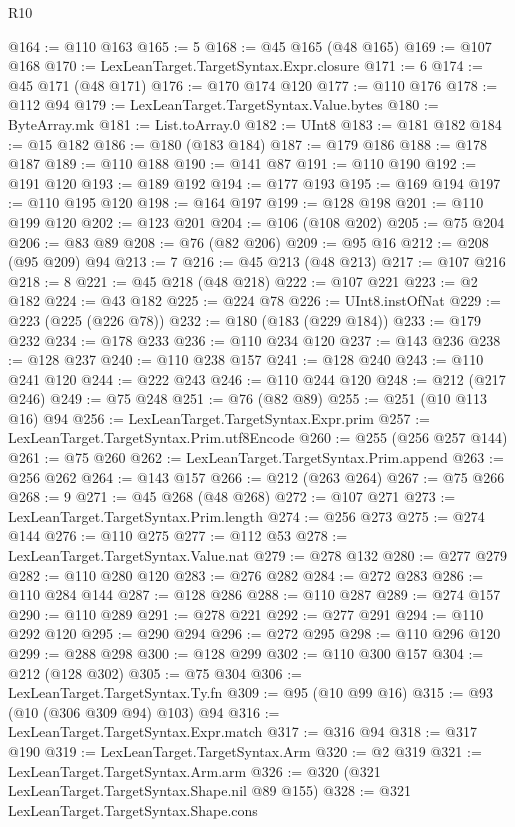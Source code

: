 \begin{lexlean}{R10}
\begin{coremodule}
@164 := @110 @163
@165 := 5
@168 := @45 @165 (@48 @165)
@169 := @107 @168
@170 := LexLeanTarget.TargetSyntax.Expr.closure
@171 := 6
@174 := @45 @171 (@48 @171)
@176 := @170 @174 @120
@177 := @110 @176
@178 := @112 @94
@179 := LexLeanTarget.TargetSyntax.Value.bytes
@180 := ByteArray.mk
@181 := List.toArray.{0}
@182 := UInt8
@183 := @181 @182
@184 := @15 @182
@186 := @180 (@183 @184)
@187 := @179 @186
@188 := @178 @187
@189 := @110 @188
@190 := @141 @87
@191 := @110 @190
@192 := @191 @120
@193 := @189 @192
@194 := @177 @193
@195 := @169 @194
@197 := @110 @195 @120
@198 := @164 @197
@199 := @128 @198
@201 := @110 @199 @120
@202 := @123 @201
@204 := @106 (@108 @202)
@205 := @75 @204
@206 := @83 @89
@208 := @76 (@82 @206)
@209 := @95 @16
@212 := @208 (@95 @209) @94
@213 := 7
@216 := @45 @213 (@48 @213)
@217 := @107 @216
@218 := 8
@221 := @45 @218 (@48 @218)
@222 := @107 @221
@223 := @2 @182
@224 := @43 @182
@225 := @224 @78
@226 := UInt8.instOfNat
@229 := @223 (@225 (@226 @78))
@232 := @180 (@183 (@229 @184))
@233 := @179 @232
@234 := @178 @233
@236 := @110 @234 @120
@237 := @143 @236
@238 := @128 @237
@240 := @110 @238 @157
@241 := @128 @240
@243 := @110 @241 @120
@244 := @222 @243
@246 := @110 @244 @120
@248 := @212 (@217 @246)
@249 := @75 @248
@251 := @76 (@82 @89)
@255 := @251 (@10 @113 @16) @94
@256 := LexLeanTarget.TargetSyntax.Expr.prim
@257 := LexLeanTarget.TargetSyntax.Prim.utf8Encode
@260 := @255 (@256 @257 @144)
@261 := @75 @260
@262 := LexLeanTarget.TargetSyntax.Prim.append
@263 := @256 @262
@264 := @143 @157
@266 := @212 (@263 @264)
@267 := @75 @266
@268 := 9
@271 := @45 @268 (@48 @268)
@272 := @107 @271
@273 := LexLeanTarget.TargetSyntax.Prim.length
@274 := @256 @273
@275 := @274 @144
@276 := @110 @275
@277 := @112 @53
@278 := LexLeanTarget.TargetSyntax.Value.nat
@279 := @278 @132
@280 := @277 @279
@282 := @110 @280 @120
@283 := @276 @282
@284 := @272 @283
@286 := @110 @284 @144
@287 := @128 @286
@288 := @110 @287
@289 := @274 @157
@290 := @110 @289
@291 := @278 @221
@292 := @277 @291
@294 := @110 @292 @120
@295 := @290 @294
@296 := @272 @295
@298 := @110 @296 @120
@299 := @288 @298
@300 := @128 @299
@302 := @110 @300 @157
@304 := @212 (@128 @302)
@305 := @75 @304
@306 := LexLeanTarget.TargetSyntax.Ty.fn
@309 := @95 (@10 @99 @16)
@315 := @93 (@10 (@306 @309 @94) @103) @94
@316 := LexLeanTarget.TargetSyntax.Expr.match
@317 := @316 @94
@318 := @317 @190
@319 := LexLeanTarget.TargetSyntax.Arm
@320 := @2 @319
@321 := LexLeanTarget.TargetSyntax.Arm.arm
@326 := @320 (@321 LexLeanTarget.TargetSyntax.Shape.nil @89 @155)
@328 := @321 LexLeanTarget.TargetSyntax.Shape.cons

\end{coremodule}
\end{lexlean}
